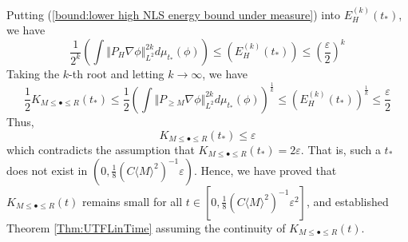 \documentclass[12pt,letterpaper,leqno]{amsart}
\theoremstyle{plain}
\numberwithin{equation}{section}
\numberwithin{theorem}{section}
\numberwithin{proposition}{section}
\numberwithin{lemma}{section}
\numberwithin{corollary}{section}
\begin{document}
Putting (\ref{bound:lower high NLS energy bound under measure}) into $%
E_{H}^{(k)}(t_{\ast })$, we have%
\begin{equation*}
\frac{1}{2^{k}}\left( \int \Vert P_{H}\nabla \phi \Vert _{L^{2}}^{2k}d\mu
_{t_{\ast }}(\phi )\right) \leqslant \left( E_{H}^{(k)}(t_{\ast })\right)
\leqslant \left( \frac{\varepsilon }{2}\right) ^{k}
\end{equation*}%
Taking the $k$-th root and letting $k\rightarrow \infty $, we have%
\begin{equation*}
\frac{1}{2}K_{M\leqslant \bullet \leqslant R}(t_{\ast })\leqslant \frac{1}{2}%
\left( \int \Vert P_{\geqslant M}\nabla \phi \Vert _{L^{2}}^{2k}d\mu
_{t_{\ast }}(\phi )\right) ^{\frac{1}{k}}\leqslant \left(
E_{H}^{(k)}(t_{\ast })\right) ^{\frac{1}{k}}\leqslant \frac{\varepsilon }{2}
\end{equation*}%
Thus,%
\begin{equation*}
K_{M\leq \bullet \leq R}(t_{\ast })\leqslant \varepsilon
\end{equation*}%
which contradicts the assumption that $K_{M\leq \bullet \leq R}(t_{\ast
})=2\varepsilon $. That is, such a $t_{\ast }$ does not exist in $\left( 0,%
\frac{1}{8}\left( C\langle M\rangle ^{2}\right) ^{-1}\varepsilon \right) $.
Hence, we have proved that $K_{M\leq \bullet \leq R}(t)$ remains small for
all $t\in \left[ 0,\frac{1}{8}\left( C\langle M\rangle ^{2}\right)
^{-1}\varepsilon ^{2}\right] $, and established Theorem \ref{Thm:UTFLinTime}
assuming the continuity of $K_{M\leq \bullet \leq R}(t)$.
\end{document}
